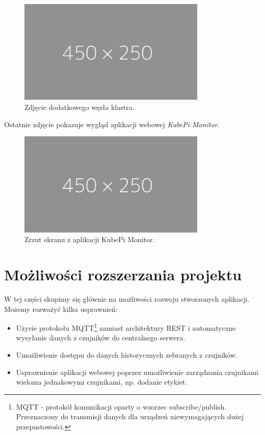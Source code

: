 \documentclass[12pt]{report}
\let\Oldsection\section
\renewcommand{\section}{\FloatBarrier\Oldsection}
\begin{document}
{\begin{figure}[h]
	\centering
	\includegraphics[width=0.8\textwidth]{images/placeholder-wide.png}
	\caption{Zdjęcie dodatkowego węzła klastra.}
\end{figure}

\noindent Ostatnie zdjęcie pokazuje wygląd aplikacji webowej \textit{KubePi Monitor}.
\begin{figure}
	\centering
	\includegraphics[width=0.8\textwidth]{images/placeholder-wide.png}
	\caption{Zrzut ekranu z aplikacji KubePi Monitor.}
\end{figure}

\section{Możliwości rozszerzania projektu}
W tej części skupimy się głównie na możliwości rozwoju stworzonych aplikacji. Możemy rozważyć kilka usprawnień:

\begin{itemize}
\item{Użycie protokołu MQTT\footnote{MQTT - protokół komunikacji oparty o wzorzec subscribe/publish. Przeznaczony do transmisji danych dla urządzeń niewymagających dużej przepustowości.} zamiast architektury REST i automatyczne wysyłanie danych z czujników do centralnego serwera.}
\item{Umożliwienie dostępu do danych historycznych zebranych z czujników.}
\item{Usprawnienie aplikacji webowej poprzez umożliwienie zarządzania czujnikami wieloma jednakowymi czujnikami, np. dodanie etykiet.}
\end{itemize}
}
\end{document}
